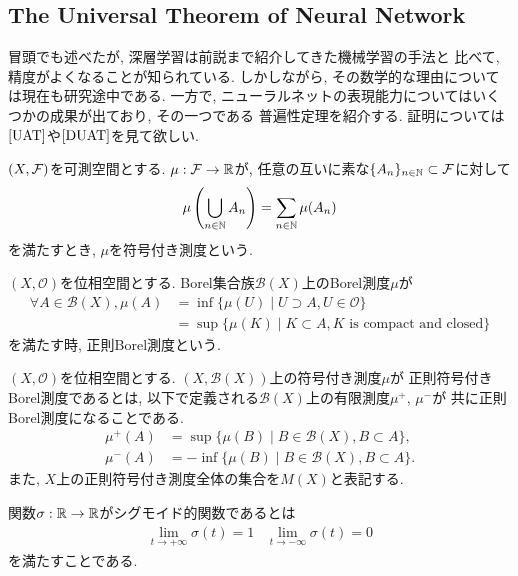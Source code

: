 \subsection{The Universal Theorem of Neural Network}
冒頭でも述べたが, 深層学習は前説まで紹介してきた機械学習の手法と
比べて, 精度がよくなることが知られている. しかしながら, その数学的な理由については現在も研究途中である. 
一方で, ニューラルネットの表現能力についてはいくつかの成果が出ており, その一つである
普遍性定理を紹介する. 証明については$\cite{UAT}$や$\cite{DUAT}$を見て欲しい.
\begin{Defi}[符号付き測度]
    $(X, \mathcal{F})$を可測空間とする. $\mu:\mathcal{F}\to\mathbb{R}$が, 任意の互いに素な$\{A_{n}\}_{n\in\mathbb{N}}\subset\mathcal{F}$に対して
    \begin{align*}
        \mu\left(\bigcup_{n\in\mathbb{N}}A_{n}\right) = \sum_{n\in\mathbb{N}}\mu(A_{n})
    \end{align*}
    を満たすとき, $\mu$を符号付き測度という. 
\end{Defi}
\begin{Defi}[正則Borel測度]
    $(X, \mathcal{O})$を位相空間とする. Borel集合族$\mathcal{B}(X)$上のBorel測度$\mu$が
    \begin{align*}
        \forall A\in\mathcal{B}(X), \mu(A) &= \inf\{\mu(U)\mid U\supset A, U\in\mathcal{O}\} \\
                                           &= \sup\{\mu(K)\mid K\subset A, K\text{ is compact and closed}\}
    \end{align*}
    を満たす時, 正則Borel測度という. 
\end{Defi}
\begin{Defi}[正則符号付きBorel測度]
    $(X, \mathcal{O})$を位相空間とする. $(X, \mathcal{B}(X))$上の符号付き測度$\mu$が
    正則符号付きBorel測度であるとは, 以下で定義される$\mathcal{B}(X)$上の有限測度$\mu^{+}$, $\mu^{-}$が
    共に正則Borel測度になることである.
    \begin{align*}
        \mu^{+}(A) &= \sup\{\mu(B)\mid B\in\mathcal{B}(X), B\subset A\},\\
        \mu^{-}(A) &= -\inf\{\mu(B)\mid B\in\mathcal{B}(X), B\subset A\}.
    \end{align*}
    また, $X$上の正則符号付き測度全体の集合を$M(X)$と表記する.
\end{Defi}
\begin{Defi}[Sigmoidal]
    関数$\sigma:\mathbb{R}\to\mathbb{R}$がシグモイド的関数であるとは
    \begin{align*}
        \lim_{t\to+\infty} \sigma(t) = 1\hspace{10pt}\lim_{t\to-\infty} \sigma(t) = 0
    \end{align*}
    を満たすことである.
\end{Defi}
